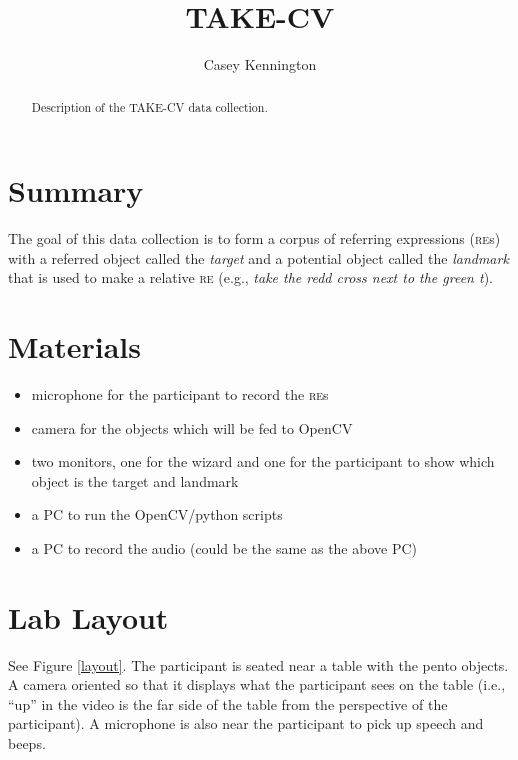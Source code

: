 \documentclass[a4paper,10pt]{article}
\title{TAKE-CV}
\author{Casey Kennington}
\begin{document}
\maketitle

\begin{abstract}
Description of the TAKE-CV data collection. 
\end{abstract}

\section{Summary}

The goal of this data collection is to form a corpus of referring expressions (\textsc{re}s) with a referred object called the \emph{target} and a potential object called the \emph{landmark} that is used to make a relative \textsc{re} (e.g., \emph{take the redd cross next to the green t}). 

\section{Materials}

\begin{itemize}
 \item microphone for the participant to record the \textsc{re}s
 \item camera for the objects which will be fed to OpenCV
 \item two monitors, one for the wizard and one for the participant to show which object is the target and landmark
 \item a PC to run the OpenCV/python scripts
 \item a PC to record the audio (could be the same as the above PC)
\end{itemize}

\section{Lab Layout}

See Figure \ref{layout}. The participant is seated near a table with the pento objects. A camera oriented so that it displays what the participant sees on the table (i.e., ``up'' in the video is the far side of the table from the perspective of the participant). A microphone is also near the participant to pick up speech and beeps. 
\end{document}
